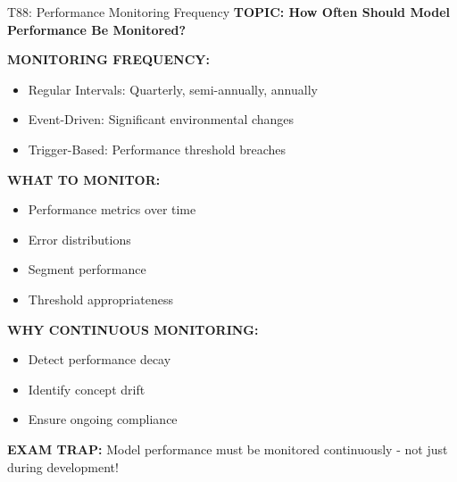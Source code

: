 \documentclass[8pt]{beamer}
\begin{document}
	\begin{frame}{T88: Performance Monitoring Frequency}
		\fontsize{6.5}{7.5}\selectfont
		\textbf{TOPIC: How Often Should Model Performance Be Monitored?}
		
		\vspace{0.1cm}
		\textbf{MONITORING FREQUENCY:}
		\begin{itemize}
			\item \textcolor{myblue}{Regular Intervals:} Quarterly, semi-annually, annually
			\item \textcolor{myblue}{Event-Driven:} Significant environmental changes
			\item \textcolor{myblue}{Trigger-Based:} Performance threshold breaches
		\end{itemize}
		
		\vspace{0.1cm}
		\textbf{WHAT TO MONITOR:}
		\begin{itemize}
			\item Performance metrics over time
			\item Error distributions
			\item Segment performance
			\item Threshold appropriateness
		\end{itemize}
		
		\vspace{0.1cm}
		\textbf{WHY CONTINUOUS MONITORING:}
		\begin{itemize}
			\item Detect performance decay
			\item Identify concept drift
			\item Ensure ongoing compliance
		\end{itemize}
		
		\textcolor{myred}{\textbf{EXAM TRAP:}} Model performance must be \textcolor{myblue}{monitored continuously} - not just during development!
	\end{frame}
	
\end{document}
